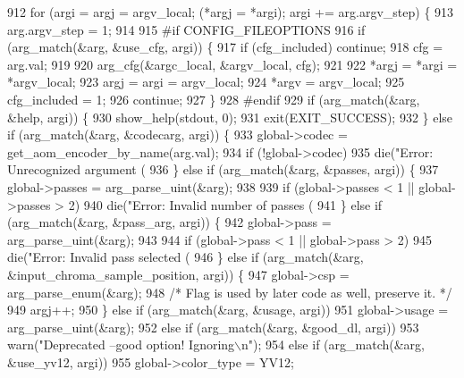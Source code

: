 \begin{DoxyCodeInclude}
{{{{{{{{{{{912   \textcolor{keywordflow}{for} (argi = argj = argv\_local; (*argj = *argi); argi += arg.argv\_step) \{
913     arg.argv\_step = 1;
914 
915 \textcolor{preprocessor}{#if CONFIG\_FILEOPTIONS}
916     \textcolor{keywordflow}{if} (arg\_match(&arg, &use\_cfg, argi)) \{
917       \textcolor{keywordflow}{if} (cfg\_included) \textcolor{keywordflow}{continue};
918       cfg = arg.val;
919 
920       arg\_cfg(&argc\_local, &argv\_local, cfg);
921 
922       *argj = *argi = *argv\_local;
923       argj = argi = argv\_local;
924       *argv = argv\_local;
925       cfg\_included = 1;
926       \textcolor{keywordflow}{continue};
927     \}
928 \textcolor{preprocessor}{#endif}
929     \textcolor{keywordflow}{if} (arg\_match(&arg, &help, argi)) \{
930       show\_help(stdout, 0);
931       exit(EXIT\_SUCCESS);
932     \} \textcolor{keywordflow}{else} \textcolor{keywordflow}{if} (arg\_match(&arg, &codecarg, argi)) \{
933       global->codec = get\_aom\_encoder\_by\_name(arg.val);
934       \textcolor{keywordflow}{if} (!global->codec)
935         die(\textcolor{stringliteral}{"Error: Unrecognized argument (%
936     \} \textcolor{keywordflow}{else} \textcolor{keywordflow}{if} (arg\_match(&arg, &passes, argi)) \{
937       global->passes = arg\_parse\_uint(&arg);
938 
939       \textcolor{keywordflow}{if} (global->passes < 1 || global->passes > 2)
940         die(\textcolor{stringliteral}{"Error: Invalid number of passes (%
941     \} \textcolor{keywordflow}{else} \textcolor{keywordflow}{if} (arg\_match(&arg, &pass\_arg, argi)) \{
942       global->pass = arg\_parse\_uint(&arg);
943 
944       \textcolor{keywordflow}{if} (global->pass < 1 || global->pass > 2)
945         die(\textcolor{stringliteral}{"Error: Invalid pass selected (%
946     \} \textcolor{keywordflow}{else} \textcolor{keywordflow}{if} (arg\_match(&arg, &input\_chroma\_sample\_position, argi)) \{
947       global->csp = arg\_parse\_enum(&arg);
948       \textcolor{comment}{/* Flag is used by later code as well, preserve it. */}
949       argj++;
950     \} \textcolor{keywordflow}{else} \textcolor{keywordflow}{if} (arg\_match(&arg, &usage, argi))
951       global->usage = arg\_parse\_uint(&arg);
952     \textcolor{keywordflow}{else} \textcolor{keywordflow}{if} (arg\_match(&arg, &good\_dl, argi))
953       warn(\textcolor{stringliteral}{"Deprecated --good option! Ignoring\(\backslash\)n"});
954     \textcolor{keywordflow}{else} \textcolor{keywordflow}{if} (arg\_match(&arg, &use\_yv12, argi))
955       global->color\_type = YV12;
}}}}}}}}}}}}}}
\end{DoxyCodeInclude}
